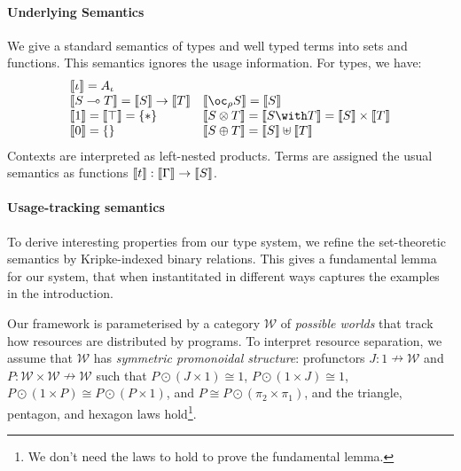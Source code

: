 \paragraph{Underlying Semantics} We give a standard semantics of types
and well typed terms into sets and functions. This semantics ignores
the usage information. For types, we have:
\begin{displaymath}
  \begin{array}{ll}
    \llbracket \base \rrbracket = A_\base \\
    \llbracket \fun{S}{T} \rrbracket = \llbracket S \rrbracket \rightarrow \llbracket T \rrbracket &
    \llbracket \excl{\rho}{S} \rrbracket = \llbracket S \rrbracket \\
    \llbracket \tensorOne \rrbracket = \llbracket \withTOne \rrbracket = \{*\} &
    \llbracket \tensor{S}{T} \rrbracket = \llbracket \withT{S}{T} \rrbracket = \llbracket S \rrbracket \times \llbracket T \rrbracket \\
    \llbracket \sumTZero \rrbracket = \{\} &
    \llbracket \sumT{S}{T} \rrbracket = \llbracket S \rrbracket \uplus \llbracket T \rrbracket \\
  \end{array}
\end{displaymath}
Contexts are interpreted as left-nested products. Terms are assigned
the usual semantics as functions $\llbracket t \rrbracket : \llbracket \Gamma \rrbracket \to \llbracket S \rrbracket$.

\paragraph{Usage-tracking semantics} To derive interesting properties
from our type system, we refine the set-theoretic semantics by
Kripke-indexed binary relations. This gives a fundamental lemma for
our system, that when instantitated in different ways captures the
examples in the introduction.

Our framework is parameterised by a category $\mathcal{W}$ of
\emph{possible worlds} that track how resources are distributed by
programs. To interpret resource separation, we assume that
$\mathcal{W}$ has \emph{symmetric promonoidal structure}: profunctors
$J : 1 \nrightarrow \mathcal{W}$ and
$P : \mathcal{W} \times \mathcal{W} \nrightarrow \mathcal{W}$ such
that $P \odot (J \times 1) \cong 1$, $P \odot (1 \times J) \cong 1$,
$P \odot (1 \times P) \cong P \odot (P \times 1)$, and
$P \cong P \odot (\pi_2 \times \pi_1)$, and the triangle, pentagon,
and hexagon laws hold\footnote{We don't need the laws to hold to prove
  the fundamental lemma.}.

